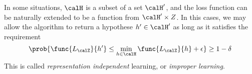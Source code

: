 \begin{remark}
    In some situations, \(\calH\) is a subset of a set \(\calH'\), and the loss function can be naturally extended to be a function from \(\calH' \times Z\). In this cases, we may allow the algorithm to return a hypothese \(h' \in \calH'\) as long as it satisfies the requirement 
    \begin{equation*}
        \prob{\func{L_{\calZ}}{h'} \leq \min_{h \in \calH} \func{L_{\calZ}}{h} + \epsilon} \geq 1- \delta
    \end{equation*}
    This is called \textit{representation independent} learning, or \textit{improper learning}.
\end{remark}